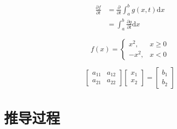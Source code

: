 \documentclass[12pt,a4paper]{article}
\newcommand{\diff}{\mathrm{d}} %
\newcommand{\pdiff}{\partial} %
\begin{document}
\begin{align}
    \frac{\pdiff f}{\pdiff t} &= \frac{\pdiff}{\pdiff t}\int_a^b g(x,t)\diff x \\
    &= \int_a^b \frac{\pdiff g}{\pdiff t}\diff x
\end{align}

\[
    f(x) = \begin{cases}
        x^2, & x \geq 0 \\
        -x^2, & x < 0
    \end{cases}
\]

\[
    \begin{bmatrix}
        a_{11} & a_{12} \\
        a_{21} & a_{22}
    \end{bmatrix}
    \begin{bmatrix}
        x_1 \\
        x_2
    \end{bmatrix} =
    \begin{bmatrix}
        b_1 \\
        b_2
    \end{bmatrix}
\]

\section{推导过程}
\end{document}
